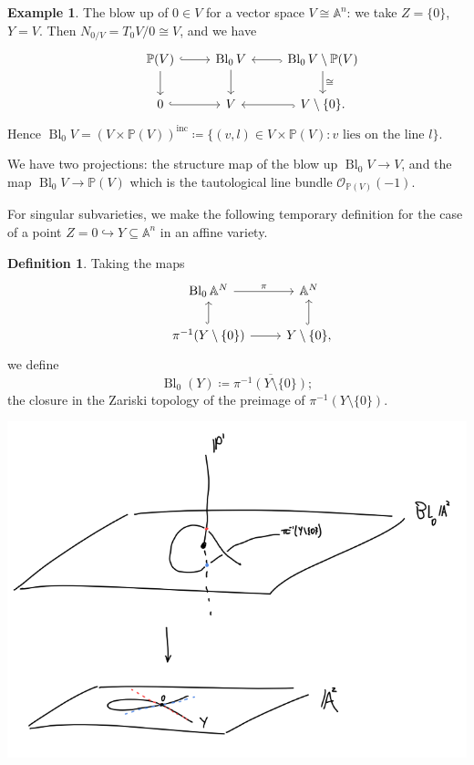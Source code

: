 \documentclass{article}
\theoremstyle{definition}
\newtheorem*{definition}{Definition}
\newtheorem*{example}{Example}
\DeclareMathOperator{\Bl}{Bl}
\newcommand{\closure}[1]{\overline{#1}}
\newcommand{\inc}{\mathrm{inc}}
\renewcommand{\O}{\mathcal{O}}
\renewcommand{\P}{\mathbb{P}}
\newcommand{\A}{\mathbb{A}}
\begin{document}
\begin{example}
    The blow up of $0\in V$ for a vector space $V\cong\A^n$: we take
    $Z=\{0\}$, $Y=V$. Then $N_{0/V}=T_0V/0\cong V$, and we have
    \begin{equation*}
        \begin{tikzcd}
            &\P(V) \ar[d] \ar[r,hook]
            &\Bl_0V \ar[d]
            &\Bl_0V\setminus\P(V) \ar[l,hook] \ar[d,"\cong"] \\
            &0 \ar[r,hook] &V &V\setminus\{0\}. \ar[l,hook]
        \end{tikzcd}
    \end{equation*}
    Hence $\Bl_0V=(V\times\P(V))^\inc
        \coloneq \{(v,l)\in V\times\P(V):\text{$v$ lies on the line $l$}\}$.
\end{example}
We have two projections: the structure map of the blow up $\Bl_0V\to V$, and the
map $\Bl_0V\to\P(V)$ which is the tautological line bundle $\O_{\P(V)}(-1)$.

For singular subvarieties, we make the following temporary definition for the
case of a point $Z=0\hookrightarrow Y\subseteq\A^n$ in an affine variety.
\begin{definition}
    Taking the maps
    \begin{equation*}
        \begin{tikzcd}
            &\Bl_0\A^N \ar[r,"\pi"] &\A^N \\
            &\pi^{-1}(Y\setminus\{0\}) \ar[u,hook] \ar[r]
            &Y\setminus\{0\}, \ar[u,hook]
        \end{tikzcd}
    \end{equation*}
    we define
    \begin{equation*}
        \Bl_0(Y) \coloneq \closure{\pi^{-1}(Y\setminus\{0\})};
    \end{equation*}
    the closure in the Zariski topology of the preimage of
    $\pi^{-1}(Y\setminus\{0\})$.
\end{definition}

\begin{center}
    \includegraphics[scale=0.5]{blowup_nodal}
\end{center}
\end{document}

